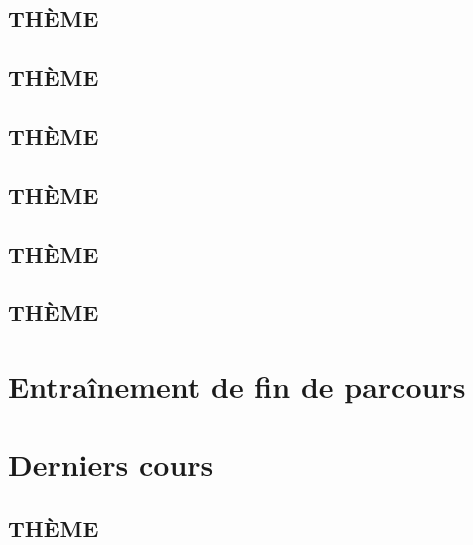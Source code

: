 \documentclass[poly,trombi]{valbonne}
\begin{document}
\subsection{THÈME}


\subsection{THÈME}


\subsection{THÈME}


\subsection{THÈME}


\subsection{THÈME}


\subsection{THÈME}






\section{Entraînement de fin de parcours}





\section{Derniers cours}

\subsection{THÈME}
\end{document}
